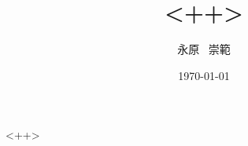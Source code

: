 \documentclass{jsarticle}
\title{<++>}
\author{永原~ 崇範 \\ }
\date{\today}
\begin{document}
%
\maketitle
%
<++>
\end{document}

